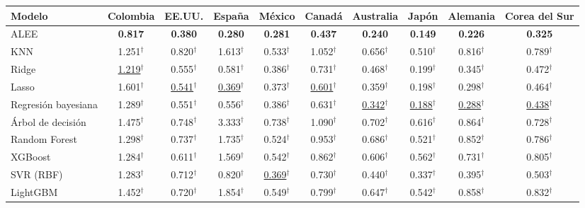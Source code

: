 \begin{tabular}{lccccccccc}
\toprule
Modelo & Colombia & EE.UU. & España & México & Canadá & Australia & Japón & Alemania & Corea del Sur \\
\midrule
ALEE & \textbf{0.817} & \textbf{0.380} & \textbf{0.280} & \textbf{0.281} & \textbf{0.437} & \textbf{0.240} & \textbf{0.149} & \textbf{0.226} & \textbf{0.325} \\
\midrule
KNN & 1.251$^{\dagger}$ & 0.820$^{\dagger}$ & 1.613$^{\dagger}$ & 0.533$^{\dagger}$ & 1.052$^{\dagger}$ & 0.656$^{\dagger}$ & 0.510$^{\dagger}$ & 0.816$^{\dagger}$ & 0.789$^{\dagger}$ \\
Ridge & \underline{1.219}$^{\dagger}$ & 0.555$^{\dagger}$ & 0.581$^{\dagger}$ & 0.386$^{\dagger}$ & 0.731$^{\dagger}$ & 0.468$^{\dagger}$ & 0.199$^{\dagger}$ & 0.345$^{\dagger}$ & 0.472$^{\dagger}$ \\
Lasso & 1.601$^{\dagger}$ & \underline{0.541}$^{\dagger}$ & \underline{0.369}$^{\dagger}$ & 0.373$^{\dagger}$ & \underline{0.601}$^{\dagger}$ & 0.359$^{\dagger}$ & 0.198$^{\dagger}$ & 0.298$^{\dagger}$ & 0.464$^{\dagger}$ \\
Regresión bayesiana & 1.289$^{\dagger}$ & 0.551$^{\dagger}$ & 0.556$^{\dagger}$ & 0.386$^{\dagger}$ & 0.631$^{\dagger}$ & \underline{0.342}$^{\dagger}$ & \underline{0.188}$^{\dagger}$ & \underline{0.288}$^{\dagger}$ & \underline{0.438}$^{\dagger}$ \\
Árbol de decisión & 1.475$^{\dagger}$ & 0.748$^{\dagger}$ & 3.333$^{\dagger}$ & 0.738$^{\dagger}$ & 1.090$^{\dagger}$ & 0.702$^{\dagger}$ & 0.616$^{\dagger}$ & 0.864$^{\dagger}$ & 0.728$^{\dagger}$ \\
Random Forest & 1.298$^{\dagger}$ & 0.737$^{\dagger}$ & 1.735$^{\dagger}$ & 0.524$^{\dagger}$ & 0.953$^{\dagger}$ & 0.686$^{\dagger}$ & 0.521$^{\dagger}$ & 0.852$^{\dagger}$ & 0.786$^{\dagger}$ \\
XGBoost & 1.284$^{\dagger}$ & 0.611$^{\dagger}$ & 1.569$^{\dagger}$ & 0.542$^{\dagger}$ & 0.862$^{\dagger}$ & 0.606$^{\dagger}$ & 0.562$^{\dagger}$ & 0.731$^{\dagger}$ & 0.805$^{\dagger}$ \\
SVR (RBF) & 1.283$^{\dagger}$ & 0.712$^{\dagger}$ & 0.820$^{\dagger}$ & \underline{0.369}$^{\dagger}$ & 0.730$^{\dagger}$ & 0.440$^{\dagger}$ & 0.337$^{\dagger}$ & 0.395$^{\dagger}$ & 0.503$^{\dagger}$ \\
LightGBM & 1.452$^{\dagger}$ & 0.720$^{\dagger}$ & 1.854$^{\dagger}$ & 0.549$^{\dagger}$ & 0.799$^{\dagger}$ & 0.647$^{\dagger}$ & 0.542$^{\dagger}$ & 0.858$^{\dagger}$ & 0.832$^{\dagger}$ \\
\bottomrule
\end{tabular}